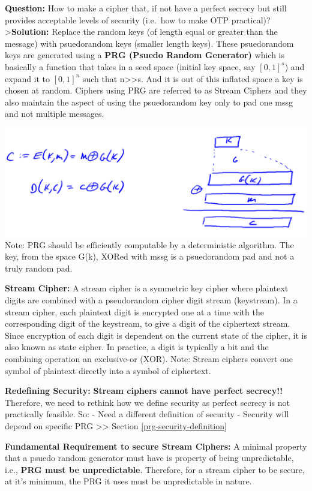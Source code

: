 \documentclass[11pt]{article}
\makeatletter
\def\maxwidth{\ifdim\Gin@nat@width>\linewidth\linewidth
    \else\Gin@nat@width\fi}
\let\Oldincludegraphics\includegraphics
\renewcommand{\includegraphics}[1]{\Oldincludegraphics[width=.8\maxwidth]{#1}}
\makeatother
\begin{document}
\textbf{Question:} How to make a cipher that, if not have a perfect
secrecy but still provides acceptable levels of security (i.e.~how to
make OTP practical)? \textgreater{}\textbf{Solution:} Replace the random
keys (of length equal or greater than the message) with psuedorandom
keys (smaller length keys). These psuedorandom keys are generated using
a \textbf{PRG (Psuedo Random Generator)} which is basically a function
that takes in a seed space (initial key space, say \([0,1]^{s}\)) and
expand it to \([0,1]^{n}\) such that n\textgreater{}\textgreater{}s. And
it is out of this inflated space a key is chosen at random. Ciphers
using PRG are referred to as Stream Ciphers and they also maintain the
aspect of using the psuedorandom key only to pad one mssg and not
multiple messages.

\includegraphics{./Images/PRG.png} Note: PRG should be efficiently
computable by a deterministic algorithm. The key, from the space G(k),
XORed with mssg is a psuedorandom pad and not a truly random pad.

\textbf{Stream Cipher:} A stream cipher is a symmetric key cipher where
plaintext digits are combined with a pseudorandom cipher digit stream
(keystream). In a stream cipher, each plaintext digit is encrypted one
at a time with the corresponding digit of the keystream, to give a digit
of the ciphertext stream. Since encryption of each digit is dependent on
the current state of the cipher, it is also known as state cipher. In
practice, a digit is typically a bit and the combining operation an
exclusive-or (XOR). Note: Stream ciphers convert one symbol of plaintext
directly into a symbol of ciphertext.

\textbf{Redefining Security:} \textbf{Stream ciphers cannot have perfect
secrecy!!} Therefore, we need to rethink how we define security as
perfect secrecy is not practically feasible. So: - Need a different
definition of security - Security will depend on specific PRG
\textgreater{}\textgreater{} Section \ref{prg-security-definition}

\textbf{Fundamental Requirement to secure Stream Ciphers:} A minimal
property that a psuedo random generator must have is property of being
unpredictable, i.e., \textbf{PRG must be unpredictable}. Therefore, for
a stream cipher to be secure, at it's minimum, the PRG it uses must be
unpredictable in nature.
\end{document}
